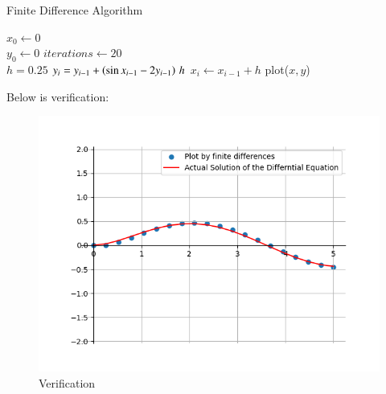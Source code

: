 \documentclass[journal]{IEEEtran}
\begin{document}
    
    \begin{algorithm}[!h]
        \caption{Finite Difference Algorithm}
        \begin{algorithmic}
            \STATE {} $x_0 \gets 0$\\
            \STATE $y_0 \gets 0$
            \STATE {} $iterations \gets 20$\\
            \STATE {} $h = 0.25$
                \STATE $\displaystyle y_{i} = y_{i-1} + \left(\sin{x_{i-1}} - 2y_{i-1}\right)\, h$
                \STATE $x_i \gets x_{i-1} + h$
            \ENDFOR
            \STATE plot($x, y$)
        \end{algorithmic}
    \end{algorithm}
    Below is verification:
    \begin{figure}[ht]  
        \centering  
        \includegraphics[width=\columnwidth]{figs/fig1.png}  
        \caption{Verification}
    \end{figure}


\end{document}
